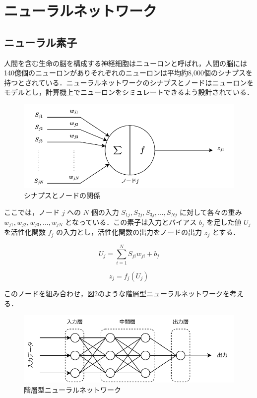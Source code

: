\section{ニューラルネットワーク}
\subsection{ニューラル素子}
人間を含む生命の脳を構成する神経細胞はニューロンと呼ばれ，人間の脳には140億個のニューロンがありそれぞれのニューロンは平均約8,000個のシナプスを持つとされている．ニューラルネットワークのシナプスとノードはニューロンをモデルとし，計算機上でニューロンをシミュレートできるよう設計されている．\cite{深層学習}

\begin{figure}[h]
    \begin{center}
        \includegraphics[scale=0.8]{img/expnode.pdf}
        \caption{シナプスとノードの関係}
    \end{center}
\end{figure}

ここでは，ノード $ j $ への $ N $ 個の入力 $ S_{1j}, S_{2j}, S_{3j}, ..., S_{Nj} $ に対して各々の重み $ w_{j1}, w_{j2}, w_{j3}, ..., w_{jN} $ となっている．この素子は入力とバイアス $ b_{j} $ を足した値 $ U_{j} $ を活性化関数 $ f_{j} $ の入力とし，活性化関数の出力をノードの出力 $ z_{j} $ とする．

\begin{equation}
    U_{j} = \sum_{i=1}^N S_{ji}w_{ji} + b_{j}
\end{equation}

\begin{equation}
    z_{j} = f_{j}(U_{j})
\end{equation}

このノードを組み合わせ，図2のような階層型ニューラルネットワークを考える．

\begin{figure}[h]
    \begin{center}
        \includegraphics[scale=0.8]{img/forwardprop.pdf}
        \caption{階層型ニューラルネットワーク}
    \end{center}
\end{figure}

